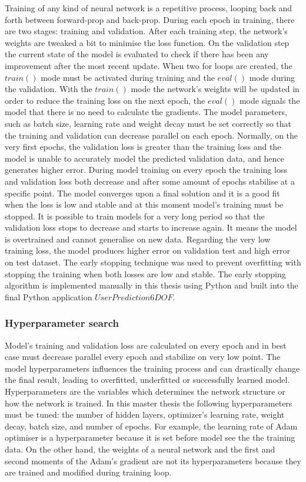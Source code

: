Training of any kind of neural network is a repetitive process, looping back and forth between forward-prop and back-prop. During each epoch in training, there are two stages: training and validation. After each training step, the network’s weights are tweaked a bit to minimise the loss function. On the validation step the current state of the model is evaluated to check if there has been any improvement after the most recent update. When two for loops are created, the $train()$ mode must be activated during training and the $eval()$ mode during the validation. With the $train()$ mode the network’s weights will be updated in order to reduce the training loss on the next epoch, the $eval()$ mode signals the model that there is no need to calculate the gradients. The model parameters, such as batch size, learning rate and weight decay must be set correctly so that the training and validation can decrease parallel on each epoch. Normally, on the very first epochs, the validation loss is greater than the training loss and the model is unable to accurately model the predicted validation data, and hence generates higher error. During model training on every epoch the training loss and validation loss both decrease and after some amount of epochs stabilise at a specific point. The model converges upon a final solution and it is a good fit when the loss is low and stable and at this moment model's training must be stopped. It is possible to train models for a very long period so that the validation loss stops to decrease and starts to increase again. It means the model is overtrained and cannot generalise on new data. Regarding the very low training loss, the model produces higher error on validation test and high error on test dataset. The early stopping technique was used to prevent overfitting with stopping the training when both losses are low and stable. The early stopping algorithm is implemented manually in this thesis using Python and built into the final Python application $UserPrediction6DOF$.

\subsubsection{Hyperparameter search}
\label{sec:impl:model:dev:search}
Model's training and validation loss are calculated on every epoch and in best case must decrease parallel every epoch and stabilize on very low point. The model hyperparameters influences the training process and can drastically change the final result, leading to overfitted, underfitted or successfully learned model. Hyperparameters are the variables which determines the network structure or how the network is trained. In this master thesis the following hyperparameters must be tuned: the number of hidden layers, optimizer's learning rate, weight decay, batch size, and number of epochs. For example, the learning rate of Adam optimiser is a hyperparameter because it is set before model see the the training data. On the other hand, the weights of a neural network and the first and second moments of the Adam's gradient are not its hyperparameters because they are trained and modified during training loop.

